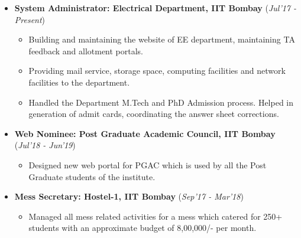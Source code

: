 \documentclass[10pt]{article}
\begin{document}
\begin{itemize}[leftmargin=0.4cm]

\item \textbf {System Administrator: Electrical Department, IIT Bombay} 
\hfill{(\textit{Jul'17 - Present})}
    \begin{itemize}
	\item Building and maintaining the website of EE department, maintaining TA feedback and allotment portals.
	\item Providing mail service, storage space, computing facilities and network facilities to the department.
	\item Handled the Department M.Tech and PhD Admission process. Helped in generation of admit cards, coordinating the answer sheet corrections.
	\end{itemize}
	
	
\item \textbf{Web Nominee: Post Graduate Academic Council, IIT Bombay}
\hfill{(\textit{Jul'18 - Jun'19})}
    \begin{itemize}
			\item Designed new web portal for PGAC which is used by all the Post Graduate students of the institute. 	
	\end{itemize}
	

\item \textbf{Mess Secretary: Hostel-1, IIT Bombay}
\hfill{(\textit{Sep'17 - Mar'18})}
    \begin{itemize}
            \item Managed all mess related activities for a mess which catered for 250+ students with an approximate budget of 8,00,000/- per month.
		\end{itemize}
			


    	
\end{itemize}


\colorbox{bl}{}
\end{document}

